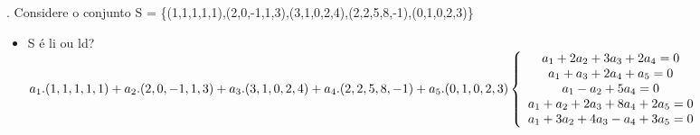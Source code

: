 \documentclass{article}
\begin{document}
. Considere o conjunto S = \{(1,1,1,1,1),(2,0,-1,1,3),(3,1,0,2,4),(2,2,5,8,-1),(0,1,0,2,3)\}
\begin{itemize}
    \item S é li ou ld?\\
\newline
$
a_{1} . (1,1,1,1,1) + a_{2}. (2,0,-1,1,3) + a_{3}. (3,1,0,2,4) + a_{4} . (2,2,5,8,-1) + a_{5} . (0,1,0,2,3)\\
\newline
\left\{\begin{array}{ccccc}
 a_{1} + 2a_{2} + 3a_{3} + 2a_{4} = 0\\
 a_{1} + a_{3} + 2a_{4} + a_{5} = 0\\
 a_{1} - a_{2} + 5a_{4} = 0\\
 a_{1} +  a_{2} + 2a_{3} + 8a_{4} + 2a_{5} = 0\\
 a_{1} +  3a_{2} + 4a_{3} - a_{4} + 3a_{5} = 0\\
\end{array}\right.$
\newline


\end{itemize}
\end{document}
